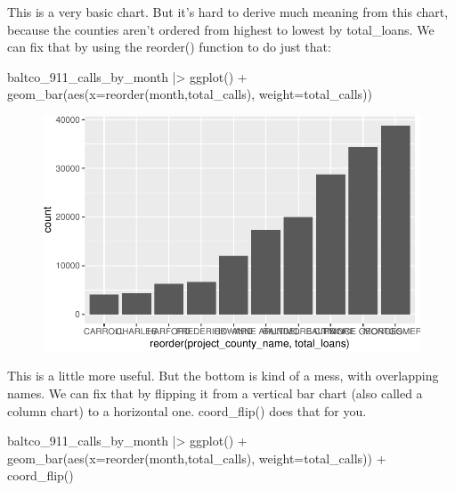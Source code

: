 \documentclass[
  letterpaper,
  DIV=11,
  numbers=noendperiod]{scrreprt}
\newenvironment{Shaded}{\begin{snugshade}}{\end{snugshade}}
\newcommand{\AttributeTok}[1]{\textcolor[rgb]{0.40,0.45,0.13}{#1}}
\newcommand{\FunctionTok}[1]{\textcolor[rgb]{0.28,0.35,0.67}{#1}}
\newcommand{\NormalTok}[1]{\textcolor[rgb]{0.00,0.23,0.31}{#1}}
\newcommand{\SpecialCharTok}[1]{\textcolor[rgb]{0.37,0.37,0.37}{#1}}
\begin{document}
This is a very basic chart. But it's hard to derive much meaning from
this chart, because the counties aren't ordered from highest to lowest
by total\_loans. We can fix that by using the reorder() function to do
just that:

\begin{Shaded}
\begin{Highlighting}[]
\NormalTok{baltco\_911\_calls\_by\_month }\SpecialCharTok{|\textgreater{}}
  \FunctionTok{ggplot}\NormalTok{() }\SpecialCharTok{+}
  \FunctionTok{geom\_bar}\NormalTok{(}\FunctionTok{aes}\NormalTok{(}\AttributeTok{x=}\FunctionTok{reorder}\NormalTok{(month,total\_calls), }\AttributeTok{weight=}\NormalTok{total\_calls))}
\end{Highlighting}
\end{Shaded}

\begin{figure}[H]

{\centering \includegraphics{./visualizing-for-reporting_files/figure-pdf/unnamed-chunk-6-1.pdf}

}

\end{figure}

This is a little more useful. But the bottom is kind of a mess, with
overlapping names. We can fix that by flipping it from a vertical bar
chart (also called a column chart) to a horizontal one. coord\_flip()
does that for you.

\begin{Shaded}
\begin{Highlighting}[]
\NormalTok{baltco\_911\_calls\_by\_month }\SpecialCharTok{|\textgreater{}}
  \FunctionTok{ggplot}\NormalTok{() }\SpecialCharTok{+}
  \FunctionTok{geom\_bar}\NormalTok{(}\FunctionTok{aes}\NormalTok{(}\AttributeTok{x=}\FunctionTok{reorder}\NormalTok{(month,total\_calls), }\AttributeTok{weight=}\NormalTok{total\_calls)) }\SpecialCharTok{+}
  \FunctionTok{coord\_flip}\NormalTok{()}
\end{Highlighting}
\end{Shaded}
\end{document}
